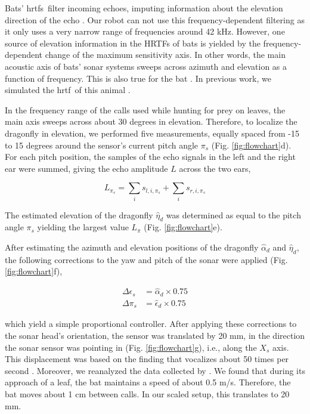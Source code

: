\documentclass[letterpaper]{article}
\newcommand{\pitch}{\pi}
\newcommand{\yaw}{\epsilon}
\newcommand{\azimuth}{\alpha}
\newcommand{\elevation}{\eta}
\newcommand{\hrtf}{\gls{hrtf}}
\newcommand{\hrtfs}{\glspl{hrtf}}
\newcommand{\flowchart}[1]{(Fig. \ref{fig:flowchart}#1)}
\begin{document}
Bats' \hrtfs\ filter incoming echoes, imputing information about the elevation direction of the echo \citep[e.g.,][and references therein]{Reijniers2007,Reijniers2010,Vanderelst2010}. Our robot can not use this frequency-dependent filtering as it only uses a very narrow range of frequencies around 42 kHz. However, one source of elevation information in the HRTFs of bats is yielded by the frequency-dependent change of the maximum sensitivity axis. In other words, the main acoustic axis of bats' sonar systems sweeps across azimuth and elevation as a function of frequency. This is also true for the bat . In previous work, we simulated the \hrtf\ of this animal \citep{Vanderelst2010}.

In the frequency range of the calls used while hunting for prey on leaves, the main axis sweeps across about 30 degrees in elevation. Therefore, to localize the dragonfly in elevation, we performed five measurements, equally spaced from -15 to 15 degrees around the sensor's current pitch angle $\pitch_s$ \flowchart{d}. For each pitch position, the samples of the echo signals in the left and the right ear were summed, giving the echo amplitude $L$ across the two ears,

\begin{equation}
    L_{\pitch_s} = \sum_i s_{l,i,\pi_s} + \sum_i s_{r,i,\pitch_s}
\end{equation}

The estimated elevation of the dragonfly $\hat{\elevation}_d$ was determined as equal to the pitch angle $\pitch_s$ yielding the largest value $L_{\pitch}$ \flowchart{e}.

After estimating the azimuth and elevation positions of the dragonfly $\hat{\azimuth}_d$ and $\hat{\elevation}_d$, the following corrections to the yaw and pitch of the sonar were applied \flowchart{f},

\begin{align}
    \Delta \yaw_s &= \hat{\alpha}_d \times 0.75\\
    \Delta \pitch_s &= \hat{\epsilon}_d \times 0.75
\end{align}

which yield a simple proportional controller. After applying these corrections to the sonar head's orientation, the sensor was translated by 20 mm, in the direction the sonar sensor was pointing in \flowchart{g}, i.e., along the $X_s$ axis. This displacement was based on the finding that  vocalizes about 50 times per second \citep{Geipel2013}. Moreover, we reanalyzed the data collected by \citet{Geipel2019}.  We found that during its approach of a leaf, the bat maintains a speed of about 0.5 m/s. Therefore, the bat moves about 1 cm between calls. In our scaled setup, this translates to 20 mm.
\end{document}
